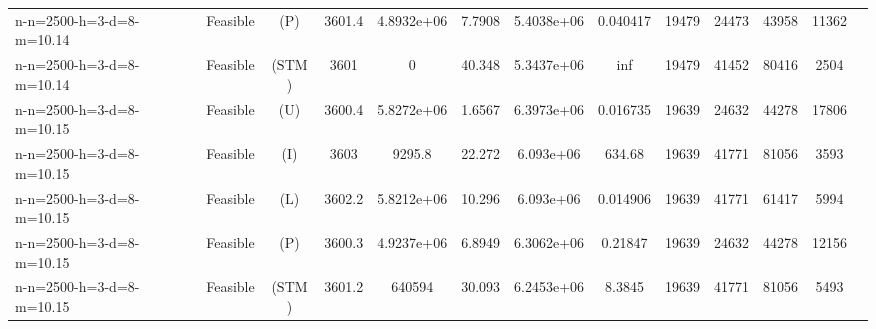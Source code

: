\documentclass[landscape, a4paper]{article}
\newcommand{\STM}{\ensuremath{\mathrm{STM}}}
\newcommand{\Improved}{\ensuremath{\mathrm{I}}}
\newcommand{\Loose}{\ensuremath{\mathrm{L}}}
\newcommand{\Profit}{\ensuremath{\mathrm{P}}}
\newcommand{\Utility}{\ensuremath{\mathrm{U}}}
\begin{document}
\begin{center}
\begin{tabular}{lcccccccccccc}
n-n=2500-h=3-d=8-m=10.14 & Feasible & (\Profit) & 3601.4 & 4.8932e+06 & 7.7908 & 5.4038e+06 & 0.040417 & 19479 & 24473 & 43958 & 11362 & \\
n-n=2500-h=3-d=8-m=10.14 & Feasible & (\STM) & 3601 & 0 & 40.348 & 5.3437e+06 & inf & 19479 & 41452 & 80416 & 2504 & \\
n-n=2500-h=3-d=8-m=10.15 & Feasible & (\Utility) & 3600.4 & 5.8272e+06 & 1.6567 & 6.3973e+06 & 0.016735 & 19639 & 24632 & 44278 & 17806 & \\
n-n=2500-h=3-d=8-m=10.15 & Feasible & (\Improved) & 3603 & 9295.8 & 22.272 & 6.093e+06 & 634.68 & 19639 & 41771 & 81056 & 3593 & \\
n-n=2500-h=3-d=8-m=10.15 & Feasible & (\Loose) & 3602.2 & 5.8212e+06 & 10.296 & 6.093e+06 & 0.014906 & 19639 & 41771 & 61417 & 5994 & \\
n-n=2500-h=3-d=8-m=10.15 & Feasible & (\Profit) & 3600.3 & 4.9237e+06 & 6.8949 & 6.3062e+06 & 0.21847 & 19639 & 24632 & 44278 & 12156 & \\
n-n=2500-h=3-d=8-m=10.15 & Feasible & (\STM) & 3601.2 & 640594 & 30.093 & 6.2453e+06 & 8.3845 & 19639 & 41771 & 81056 & 5493 & \\
\end{tabular}
\end{center}
\end{document}
